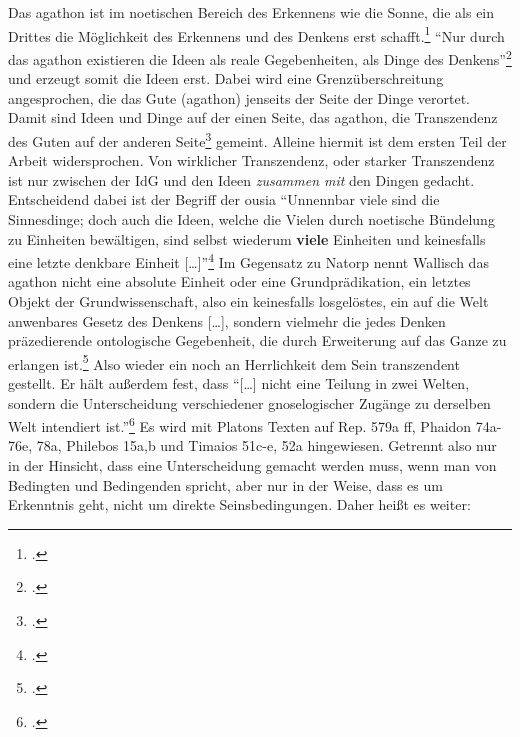 Das agathon ist im noetischen Bereich des Erkennens wie die Sonne, die als ein Drittes die Möglichkeit des Erkennens und des Denkens erst schafft.\footcite[vgl.][S. 10]{Wallisch} 
\enquote{Nur durch das agathon existieren die Ideen als reale Gegebenheiten, als Dinge des Denkens}\footcite[][S. 11]{Wallisch} und erzeugt somit die Ideen erst. Dabei wird eine Grenzüberschreitung angesprochen, die das Gute (agathon) jenseits der Seite der Dinge verortet. Damit sind Ideen und Dinge auf der einen Seite, das agathon, die Transzendenz des Guten auf der anderen Seite\footcite[vgl.][S. 11]{Wallisch} gemeint.
Alleine hiermit ist dem ersten Teil der Arbeit widersprochen. Von wirklicher Transzendenz, oder starker Transzendenz ist nur zwischen der IdG und den Ideen \emph{zusammen mit} den Dingen gedacht.
Entscheidend dabei ist der Begriff der ousia
\enquote{Unnennbar viele sind die Sinnesdinge; doch auch die Ideen, welche die Vielen durch noetische Bündelung zu Einheiten bewältigen, sind selbst wiederum \textbf{viele} Einheiten und keinesfalls eine letzte denkbare Einheit [\dots]}\footcite[vgl.][S. 12]{Wallisch}
Im Gegensatz zu Natorp nennt Wallisch das agathon nicht eine absolute Einheit oder eine Grundprädikation, ein letztes Objekt der Grundwissenschaft, also ein keinesfalls losgelöstes, ein auf die Welt anwenbares Gesetz des Denkens [\dots], sondern vielmehr die jedes Denken präzedierende ontologische Gegebenheit, die durch Erweiterung auf das Ganze zu erlangen ist.\footcite[vgl.][S. 14]{Wallisch} Also wieder ein noch an Herrlichkeit dem Sein transzendent gestellt.
Er hält außerdem fest, dass \enquote{[\dots] nicht eine Teilung in zwei Welten, sondern die Unterscheidung verschiedener gnoselogischer Zugänge zu derselben Welt intendiert ist.}\footcite[vgl.][S. 15]{Wallisch}
Es wird mit Platons Texten auf Rep. 579a ff, Phaidon 74a-76e, 78a, Philebos 15a,b und Timaios 51c-e, 52a hingewiesen. Getrennt also nur in der Hinsicht, dass eine Unterscheidung gemacht werden muss, wenn man von Bedingten und Bedingenden spricht, aber nur in der Weise, dass es um Erkenntnis geht, nicht um direkte Seinsbedingungen. Daher heißt es weiter: 
